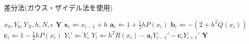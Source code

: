 \begin{algorithm}
\label{al:difference-gauss-seidel}
\caption{差分法(ガウス・ザイデル法を使用)}
\begin{algorithmic}
\REQUIRE $x_0,Y_0,Y_N,h,N,\epsilon$
\ENSURE $\boldsymbol{Y}$
    \STATE $\boldsymbol{x}_i\Leftarrow x_{i-1}+h$
    \STATE $\boldsymbol{a}_i\Leftarrow 1+\frac{1}{2}hP(x_i)$
    \STATE $\boldsymbol{b}_i\Leftarrow -(2+h^2Q(x_i))$
    \STATE $\boldsymbol{c}_i\Leftarrow 1-\frac{1}{2}hP(x_i)$
\ENDFOR
{}
        \STATE $Y_i'\Leftarrow Y_i$
        \STATE $Y_i\Leftarrow h^2R(x_i)-\boldsymbol{a}_iY_{i-1}'-\boldsymbol{c}_iY_{i+1}'$
    \ENDFOR
\ENDWHILE
\RETURN $\boldsymbol{Y}$
\end{algorithmic}
\end{algorithm}










\clearpage